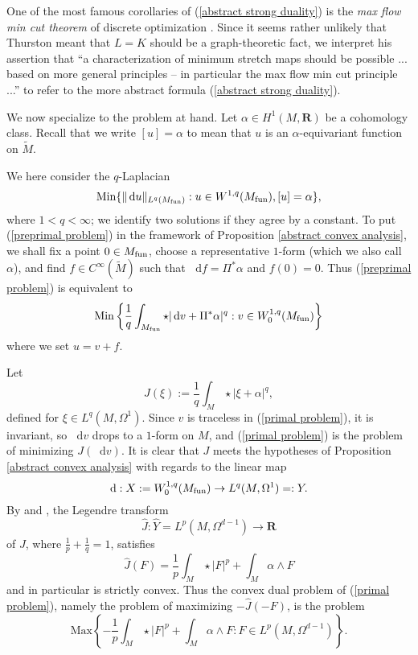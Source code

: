 \documentclass[reqno,11pt]{amsart}
\newcommand{\RR}{\mathbf{R}}
\newcommand*\dif{\mathop{}\!\mathrm{d}}
\newcommand{\Min}{\mathrm{Min}}
\newcommand{\Max}{\mathrm{Max}}
\newcommand{\dfn}[1]{\emph{#1}\index{#1}}
\theoremstyle{definition}
\numberwithin{equation}{section}
\begin{document}
One of the most famous corollaries of (\ref{abstract strong duality}) is the \dfn{max flow min cut theorem} of discrete optimization \cite[Chapter 7]{umesh2006algorithms}.
Since it seems rather unlikely that Thurston meant that $L = K$ should be a graph-theoretic fact, we interpret his assertion that ``a characterization of minimum stretch maps should be possible ... based on more general principles -- in particular the max flow min cut principle ...'' to refer to the more abstract formula (\ref{abstract strong duality}).

We now specialize to the problem at hand.
Let $\alpha \in H^1(M, \RR)$ be a cohomology class.
Recall that we write $[u] = \alpha$ to mean that $u$ is an $\alpha$-equivariant function on $\tilde M$.

We here consider the $q$-Laplacian
\begin{equation}\label{preprimal problem}
	\Min\{\|\dif u\|_{L^q(M_{\rm fun})}: u \in W^{1, q}(M_{\rm fun}), [u] = \alpha\},
\end{equation}
where $1 < q < \infty$; we identify two solutions if they agree by a constant.
To put (\ref{preprimal problem}) in the framework of Proposition \ref{abstract convex analysis}, we shall fix a point $0 \in M_{\rm fun}$, choose a representative $1$-form (which we also call $\alpha$), and find $f \in C^\infty(\tilde M)$ such that $\dif f = \Pi^*\alpha$ and $f(0) = 0$.
Thus (\ref{preprimal problem}) is equivalent to
\begin{equation}\label{primal problem}
	\Min\left\{\frac{1}{q} \int_{M_{\rm fun}} \star|\dif v + \Pi^* \alpha|^q: v \in W^{1, q}_0(M_{\rm fun})\right\}
\end{equation}
where we set $u = v + f$.

Let
$$J(\xi) := \frac{1}{q} \int_M \star|\xi + \alpha|^q,$$
defined for $\xi \in L^q(M, \Omega^1)$.
Since $v$ is traceless in (\ref{primal problem}), it is invariant, so $\dif v$ drops to a $1$-form on $M$, and (\ref{primal problem}) is the problem of minimizing $J(\dif v)$.
It is clear that $J$ meets the hypotheses of Proposition \ref{abstract convex analysis} with regards to the linear map
\begin{equation}\label{derivative on traceless}
\dif: X := W^{1, q}_0(M_{\rm fun}) \to L^q(M, \Omega^1) =: Y.
\end{equation}
By \cite[Chapter I, (4.9)]{Ekeland99} and \cite[Chapter I, Remark 4.1]{Ekeland99}, the Legendre transform
$$\hat J: \hat Y = L^p(M, \Omega^{d - 1}) \to \RR$$
of $J$, where $\frac{1}{p} + \frac{1}{q} = 1$, satisfies
\begin{equation}\label{Legendre transform}
\hat J(F) = \frac{1}{p} \int_M \star |F|^p + \int_M \alpha \wedge F
\end{equation}
and in particular is strictly convex.
Thus the convex dual problem of (\ref{primal problem}), namely the problem of maximizing $-\hat J(-F)$, is the problem
\begin{equation}\label{predual problem}
\Max\left\{- \frac{1}{p} \int_M \star |F|^p + \int_M \alpha \wedge F: F \in L^p(M, \Omega^{d - 1})\right\}.
\end{equation}
\end{document}

